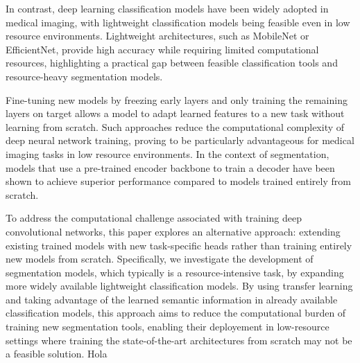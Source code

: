 \documentclass[conference]{IEEEtran}
\begin{document}
In contrast, deep learning classification models have been widely adopted in medical imaging\cite{Zhou2021}, with lightweight classification models being feasible even in low resource environments\cite{Gorenshtein2025}. Lightweight architectures, such as MobileNet or EfficientNet, provide high accuracy while requiring limited computational resources\cite{Tan2019EfficientNet}\cite{Howa2017}, highlighting a practical gap between feasible classification tools and resource-heavy segmentation models.


Fine-tuning new models by freezing early layers and only training the remaining layers on target allows a model to adapt learned features to a new task without learning from scratch. Such approaches reduce the computational complexity of deep neural network training, proving to be particularly advantageous for medical imaging tasks in low resource environments\cite{Ayana2024}. In the context of segmentation, models that use a pre-trained encoder backbone to train a decoder have been shown to achieve superior performance compared to models trained entirely from scratch\cite{Khorasani2025}.


To address the computational challenge associated with training deep convolutional networks, this paper explores an alternative approach: extending existing trained models with new task-specific heads rather than training entirely new models from scratch. Specifically, we investigate the development of segmentation models, which typically is a resource-intensive task, by expanding more widely available lightweight classification models. By using transfer learning and taking advantage of the learned semantic information in already available classification models, this approach aims to reduce the computational burden of training new segmentation tools, enabling their deployement in low-resource settings where training the state-of-the-art architectures from scratch may not be a feasible solution. Hola
\end{document}
